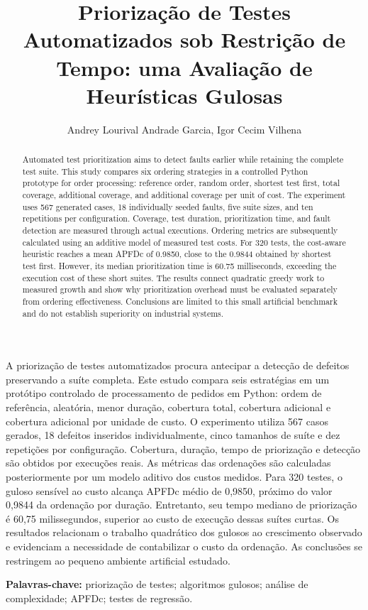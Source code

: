 \documentclass[12pt]{article}
\title{Priorização de Testes Automatizados sob Restrição de Tempo: uma Avaliação de Heurísticas Gulosas}
\author{Andrey Lourival Andrade Garcia\inst{1}, Igor Cecim Vilhena\inst{2}}
\begin{document}
\maketitle
\begin{abstract}
Automated test prioritization aims to detect faults earlier while retaining the complete test suite. This study compares six ordering strategies in a controlled Python prototype for order processing: reference order, random order, shortest test first, total coverage, additional coverage, and additional coverage per unit of cost. The experiment uses 567 generated cases, 18 individually seeded faults, five suite sizes, and ten repetitions per configuration. Coverage, test duration, prioritization time, and fault detection are measured through actual executions. Ordering metrics are subsequently calculated using an additive model of measured test costs. For 320 tests, the cost-aware heuristic reaches a mean APFDc of 0.9850, close to the 0.9844 obtained by shortest test first. However, its median prioritization time is 60.75 milliseconds, exceeding the execution cost of these short suites. The results connect quadratic greedy work to measured growth and show why prioritization overhead must be evaluated separately from ordering effectiveness. Conclusions are limited to this small artificial benchmark and do not establish superiority on industrial systems.
\end{abstract}
\begin{resumo}
A priorização de testes automatizados procura antecipar a detecção de defeitos preservando a suíte completa. Este estudo compara seis estratégias em um protótipo controlado de processamento de pedidos em Python: ordem de referência, aleatória, menor duração, cobertura total, cobertura adicional e cobertura adicional por unidade de custo. O experimento utiliza 567 casos gerados, 18 defeitos inseridos individualmente, cinco tamanhos de suíte e dez repetições por configuração. Cobertura, duração, tempo de priorização e detecção são obtidos por execuções reais. As métricas das ordenações são calculadas posteriormente por um modelo aditivo dos custos medidos. Para 320 testes, o guloso sensível ao custo alcança APFDc médio de 0,9850, próximo do valor 0,9844 da ordenação por duração. Entretanto, seu tempo mediano de priorização é 60,75 milissegundos, superior ao custo de execução dessas suítes curtas. Os resultados relacionam o trabalho quadrático dos gulosos ao crescimento observado e evidenciam a necessidade de contabilizar o custo da ordenação. As conclusões se restringem ao pequeno ambiente artificial estudado.
\end{resumo}
\noindent\textbf{Palavras-chave:} priorização de testes; algoritmos gulosos; análise de complexidade; APFDc; testes de regressão.
\end{document}
